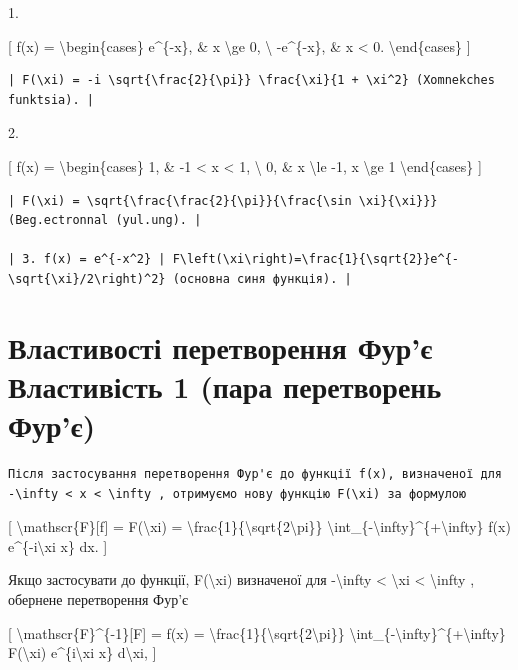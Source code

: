 \documentclass[
]{article}
\begin{document}
1.

{[} f(x) = \textbackslash begin\{cases\} e\^{}\{-x\}, \& x
\textbackslash ge 0, \textbackslash{} -e\^{}\{-x\}, \& x \textless{} 0.
\textbackslash end\{cases\} {]}

\begin{verbatim}
| F(\xi) = -i \sqrt{\frac{2}{\pi}} \frac{\xi}{1 + \xi^2} (Xomnekches funktsia). |
\end{verbatim}

2.

{[} f(x) = \textbackslash begin\{cases\} 1, \& -1 \textless{} x
\textless{} 1, \textbackslash{} 0, \& x \textbackslash le -1, x
\textbackslash ge 1 \textbackslash end\{cases\} {]}

\begin{verbatim}
| F(\xi) = \sqrt{\frac{\frac{2}{\pi}}{\frac{\sin \xi}{\xi}}} (Beg.ectronnal (yul.ung). |

| 3. f(x) = e^{-x^2} | F\left(\xi\right)=\frac{1}{\sqrt{2}}e^{-\sqrt{\xi}/2\right)^2} (основна синя функція). |
\end{verbatim}

\section{Властивості перетворення Фур'є Властивість 1 (пара перетворень
Фур'є)}\label{ux432ux43bux430ux441ux442ux438ux432ux43eux441ux442ux456-ux43fux435ux440ux435ux442ux432ux43eux440ux435ux43dux43dux44f-ux444ux443ux440ux454-ux432ux43bux430ux441ux442ux438ux432ux456ux441ux442ux44c-1-ux43fux430ux440ux430-ux43fux435ux440ux435ux442ux432ux43eux440ux435ux43dux44c-ux444ux443ux440ux454}

\begin{verbatim}
Після застосування перетворення Фур'є до функції f(x), визначеної для -\infty < x < \infty , отримуємо нову функцію F(\xi) за формулою
\end{verbatim}

{[} \textbackslash mathscr\{F\}{[}f{]} = F(\textbackslash xi) =
\textbackslash frac\{1\}\{\textbackslash sqrt\{2\textbackslash pi\}\}
\textbackslash int\_\{-\textbackslash infty\}\^{}\{+\textbackslash infty\}
f(x) e\^{}\{-i\textbackslash xi x\} dx. {]}

Якщо застосувати до функції, F(\textbackslash xi) визначеної для
-\textbackslash infty \textless{} \textbackslash xi \textless{}
\textbackslash infty , обернене перетворення Фур'є

{[} \textbackslash mathscr\{F\}\^{}\{-1\}{[}F{]} = f(x) =
\textbackslash frac\{1\}\{\textbackslash sqrt\{2\textbackslash pi\}\}
\textbackslash int\_\{-\textbackslash infty\}\^{}\{+\textbackslash infty\}
F(\textbackslash xi) e\^{}\{i\textbackslash xi x\} d\textbackslash xi,
{]}
\end{document}
